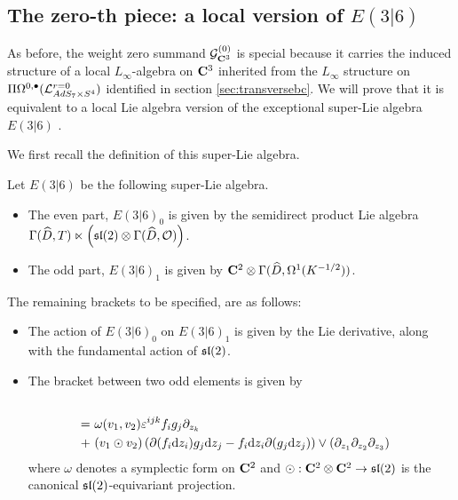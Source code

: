 \documentclass[../main.tex]{subfiles}
\begin{document}
\subsection{The zero-th piece: a local version of $E(3|6)$}

As before, the weight zero summand $\mathcal{G}_{\mathbf{C}^3} ^{(0)}$ is special because it carries the induced structure of a local $L_\infty$-algebra on ${\mathbf{C}^3} $ inherited from the $L_\infty$ structure on $\Pi\Omega^{0,\bullet} (\mathcal{L}^{r = 0}_{AdS_7\times S^4} )$ identified in section \ref{sec:transversebc}. We will prove that it is equivalent to a local Lie algebra version of the exceptional super-Lie algebra $E(3|6)$ \cite{KacBible}.

We first recall the definition of this super-Lie algebra. 

\begin{defn}\label{defn:e(3|6)}
Let $E(3|6)$ be the following super-Lie algebra.
\begin{itemize}
\item The even part, $E(3|6)_0$ is given by the semidirect product Lie algebra $\Gamma(\widehat D, T) \ltimes \left ( \mathfrak{sl}(2) \otimes \Gamma (\widehat D, \mathcal{O}) \right )$. 
\item The odd part, $E(3|6)_1$ is given by $\mathbf{C}^2\otimes \Gamma (\widehat D, \Omega^1(K^{-1/2} ))$. 
\end{itemize}
The remaining brackets to be specified, are as follows:
\begin{itemize}
\item The action of $E(3|6)_0$ on $E(3|6)_1$ is given by the Lie derivative, along with the fundamental action of $\mathfrak{sl}(2)$. 
\item The bracket between two odd elements is given by 
\begin{align*}
[v_1\otimes f_i \d z_i \otimes (\del_{z_1}\del_{z_2}\del_{z_3})^{1/2} &, v_2\otimes g_j \d z_j \otimes (\del_{z_1}\del_{z_2}\del_{z_3})^{1/2} ]  \\ 
 = & \  \omega (v_1, v_2) \eps^{ijk} f_i g_j \del_{z_k}  \\
 + & \  (v_1 \odot v_2) \left ( \del (f_i \d z_i ) g_j \d z_j  - f_i \d z_i \del (g_j \d z_j)  \right )\vee (\del_{z_1}\del_{z_2}\del_{z_3} )
\end{align*}
where $\omega$ denotes a symplectic form on $\mathbf{C}^2$ and $\odot: \mathbf{C}^2\otimes \mathbf{C}^2 \to \mathfrak{sl}(2)$ is the canonical $\mathfrak{sl}(2)$-equivariant projection. 
\end{itemize}
\end{defn}
\end{document}
